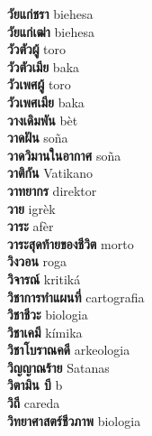 \textbf{ วัยแก่ชรา  } biehesa \\
\textbf{ วัยแก่เฒ่า  } biehesa \\
\textbf{ วัวตัวผู้  } toro \\
\textbf{ วัวตัวเมีย  } baka \\
\textbf{ วัวเพศผู้  } toro \\
\textbf{ วัวเพศเมีย  } baka \\
\textbf{ วางเดิมพัน  } bèt \\
\textbf{ วาดฝัน  } soña \\
\textbf{ วาดวิมานในอากาศ  } soña \\
\textbf{ วาติกัน  } Vatikano \\
\textbf{ วาทยากร  } direktor \\
\textbf{ วาย  } igrèk \\
\textbf{ วาระ  } afèr \\
\textbf{ วาระสุดท้ายของชีวิต  } morto \\
\textbf{ วิงวอน  } roga \\
\textbf{ วิจารณ์  } kritiká \\
\textbf{ วิชาการทำแผนที่  } cartografia \\
\textbf{ วิชาชีวะ  } biologia \\
\textbf{ วิชาเคมี  } kímika \\
\textbf{ วิชาโบราณคดี  } arkeologia \\
\textbf{ วิญญาณร้าย  } Satanas \\
\textbf{ วิตามิน บี  } b \\
\textbf{ วิถี  } careda \\
\textbf{ วิทยาศาสตร์ชีวภาพ  } biologia \\
